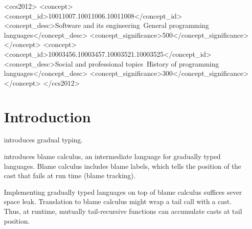 \documentclass[acmsmall,review,anonymous]{acmart}\settopmatter{printfolios=true,printccs=false,printacmref=false}
\begin{document}
\begin{CCSXML}
<ccs2012>
<concept>
<concept_id>10011007.10011006.10011008</concept_id>
<concept_desc>Software and its engineering~General programming languages</concept_desc>
<concept_significance>500</concept_significance>
</concept>
<concept>
<concept_id>10003456.10003457.10003521.10003525</concept_id>
<concept_desc>Social and professional topics~History of programming languages</concept_desc>
<concept_significance>300</concept_significance>
</concept>
</ccs2012>
\end{CCSXML}





\maketitle


\section{Introduction}

\citet{siek2006gradual} introduces gradual typing.

\citet{wadler2009well} introduces blame calculus, an intermediate language for 
gradually typed languages. Blame calculus includes blame labels, which tells 
the position of the cast that fails at run time (blame tracking).

Implementing gradually typed languages on top of blame calculus suffices sever 
space leak. Translation to blame calculus might wrap a tail call with a 
cast. Thus, at runtime, mutually tail-recursive functions can accumulate casts 
at tail position.
\end{document}
